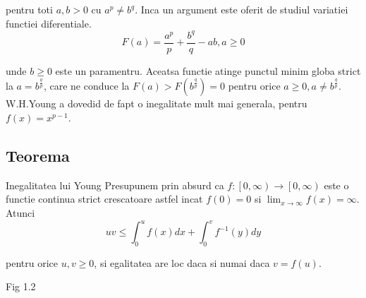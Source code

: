 \documentclass[a4paper,12pt,oneside]{report}
\begin{document}
pentru toti \(a,b>0\) cu \(a^{p}\neq b^{q}\). Inca un argument este oferit de studiul variatiei functiei diferentiale. 
\begin{displaymath}
  F\left ( a \right )= \frac{a^{p}}{p}+\frac{b^{q}}{q} - ab, a\geq 0
\end{displaymath}

unde \(b\geq 0\) este un paramentru. Aceatsa functie atinge punctul minim globa strict la \(a= b^{\frac{q}{p}}\), care ne conduce la \(F\left ( a \right )> F\left ( b^{\frac{q}{p}} \right ) = 0\) pentru orice \(a\geq 0, a\neq b^{\frac{q}{p}}\). 
	W.H.Young a dovedid de fapt  o inegalitate mult mai generala, pentru \(f\left ( x \right )=  x^{p-1}\).

\subsection{Teorema}

Inegalitatea lui Young
Presupunem prin absurd ca \(f: \left [ 0,\infty  \right ) \rightarrow \left [ 0,\infty  \right )\) este o functie continua strict crescatoare astfel incat \(f\left ( 0 \right )= 0\) si \(\lim_{x\rightarrow \infty }f\left ( x \right )= \infty\). Atunci 
\begin{displaymath}
  uv\leq \int_{0}^{u}f\left ( x \right )dx + \int_{0}^{v}f^{-1}\left ( y \right )dy
\end{displaymath}

pentru orice \(u,v\geq 0\), si egalitatea are loc daca si numai daca \( v = f\left ( u \right )\). 

Fig 1.2
\end{document}
